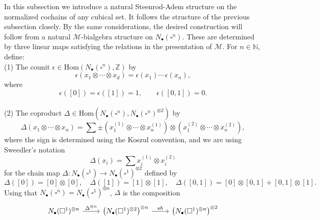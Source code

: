 \documentclass[A4]{amsart}
\theoremstyle{definition}
\newcommand{\Z}{\mathbb{Z}}
\newcommand{\Hom}{\mathrm{Hom}}
\begin{document}
In this subsection we introduce a natural Steenrod-Adem structure on the normalized cochains of any cubical set. It follows the structure of the previous subsection closely. By the same considerations, the desired construction will follow from a natural $\mathcal M$-bialgebra structure on $N_\bullet(\square^n)$. These are determined by three linear maps satisfying the relations in the presentation of $\mathcal M$. For $n \in \mathbb{N}$, define: \vspace*{5pt} \\
(1) The counit $\epsilon \in \Hom(N_\bullet(\square^n), \Z)$ by
\begin{equation*}
\epsilon \left( x_1 \otimes \cdots \otimes x_d \right) = \epsilon(x_1) \cdots \, \epsilon(x_n),
\end{equation*}
where
\begin{equation*}
\epsilon([0]) = \epsilon([1]) = 1, \qquad \epsilon([0, 1]) = 0.
\end{equation*} \vspace*{-6pt} \\
(2) The coproduct $\Delta \in \Hom \left( N_\bullet(\square^n), N_\bullet(\square^n)^{\otimes 2} \right)$ by
\begin{equation*}	
\Delta (x_1 \otimes \cdots \otimes x_n) = 	
\sum \pm \left( x_1^{(1)} \otimes \cdots \otimes x_n^{(1)} \right) \otimes 	
\left( x_1^{(2)} \otimes \cdots \otimes x_n^{(2)} \right),	
\end{equation*}	
where the sign is determined using the Koszul convention, and we are using Sweedler's notation
\begin{equation*}	
\Delta(x_i) = \sum x_i^{(1)} \otimes x_i^{(2)}
\end{equation*}
for the chain map $\Delta \colon N_\bullet(\square^1) \to N_\bullet(\square^1)^{\otimes 2}$ defined by
\begin{equation*}
\Delta([0]) = [0] \otimes [0], \quad \Delta([1]) = [1] \otimes [1], \quad \Delta([0, 1]) = [0] \otimes [0, 1] + [0, 1] \otimes [1].
\end{equation*}
Using that $N_\bullet(\square^n) = N_\bullet(\square^1)^{\otimes n}$, $\Delta$ is the composition
\begin{equation*}
\begin{tikzcd}
N_\bullet(\square^1)^{\otimes n} \arrow[r, "\Delta^{\otimes n}"] & \left( N_\bullet(\square^1)^{\otimes 2}  \right)^{\otimes n} \arrow[r, "sh"] & \left( N_\bullet(\square^1)^{\otimes n} \right)^{\otimes 2}
\end{tikzcd}
\end{equation*}
\end{document}
